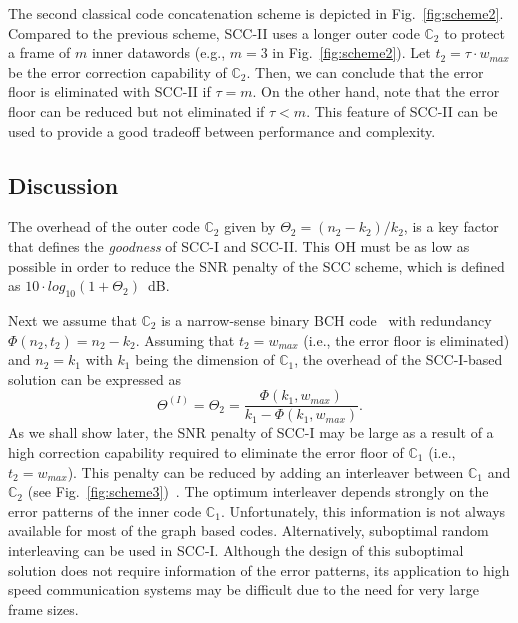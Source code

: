 \documentclass[conference]{IEEEtran}
\newcommand{\C}{\mathbb{C}}  %
\begin{document}
The second classical code concatenation scheme is depicted in
Fig.~\ref{fig:scheme2}. Compared to the previous scheme, SCC-II uses a
longer outer code $\C_2$ to protect a frame of $m$ inner datawords
(e.g., $m=3$ in Fig.~\ref{fig:scheme2}). Let $t_2=\tau\cdot w_{max}$
be the error correction capability of $\C_2$.  Then, we can conclude
that the error floor is eliminated with SCC-II if $\tau=m$. On the
other hand, note that the error floor can be reduced but not
eliminated if $\tau < m$. This feature of SCC-II can be used to
provide a good tradeoff between performance and complexity.


\subsection{Discussion} \label{sec:disadv_serial_schemes}

The overhead of the outer code $\C_2$ given by
$\Theta_2=(n_2-k_2)/k_2$, is a key factor that defines the
\emph{goodness} of SCC-I and SCC-II. This OH must be as low as
possible in order to reduce the SNR penalty of the SCC scheme, which
is defined as $10\cdot log_{10}(1+\Theta_2)$~dB.

Next we assume that $\C_2$ is a narrow-sense binary BCH
code~\cite{HP2003,RL2009} with redundancy
$\Phi(n_2,t_2)=n_2-k_2$. Assuming that $t_2=w_{max}$ (i.e., the error
floor is eliminated) and $n_2=k_1$ with $k_1$ being the dimension of
$\C_1$, the overhead of the SCC-I-based solution can be expressed as
\begin{equation}
\label{equ:oh1}
  \Theta ^{(I)} =\Theta_{2}= \frac{\Phi(k_1,w_{max})}{k_1-\Phi(k_1,w_{max})}.
\end{equation}
As we shall show later, the SNR penalty of SCC-I may be large as a
result of a high correction capability required to eliminate the error
floor of $\C_1$ (i.e., $t_2=w_{max}$). This penalty can be reduced by
adding an interleaver between $\C_1$ and $\C_2$ (see
Fig.~\ref{fig:scheme3})~\cite{669119}. The optimum interleaver depends
strongly on the error patterns of the inner code
$\C_1$. Unfortunately, this information is not always available for
most of the graph based codes. Alternatively, suboptimal random
interleaving can be used in SCC-I. Although the design of this
suboptimal solution does not require information of the error
patterns, its application to high speed communication systems may be
difficult due to the need for very large frame sizes.
\end{document}
